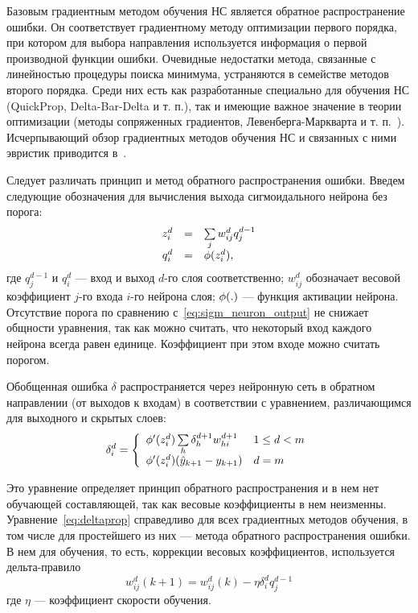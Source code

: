 Базовым градиентным методом обучения НС является обратное
распространение ошибки.  Он соответствует градиентному методу
оптимизации первого порядка, при котором для выбора направления
используется информация о первой производной функции ошибки.
Очевидные недостатки метода, связанные с линейностью процедуры поиска
минимума, устраняются в семействе методов второго порядка.  Среди них
есть как разработанные специально для обучения НС (QuickProp,
Delta-Bar-Delta и т. п.), так и имеющие важное значение в теории
оптимизации (методы сопряженных градиентов, Левенберга-Маркварта и
т. п.~\cite{himmelblau75}).  Исчерпывающий обзор градиентных методов
обучения НС и связанных с ними эвристик приводится в~\cite{gibb96}.

Следует различать принцип и метод обратного распространения ошибки.
Введем следующие обозначения для вычисления выхода сигмоидального
нейрона без порога:
\begin{equation}
\label{eq:sigm_neuron_output_parts}
\begin{array}{rcl}
  z^d_i & = & \sum\limits_j w^d_{ij}q^{d-1}_j \\
  q^d_i & = & \fa(z^d_i),
\end{array}
\end{equation} где $q^{d-1}_j$ и $q^d_i$ --- вход и выход $d$-го слоя
соответственно; $w^d_{ij}$ обозначает весовой коэффициент $j$-го входа
$i$-го нейрона слоя; $\phi(.)$ --- функция активации нейрона.
Отсутствие порога по сравнению с~\eqref{eq:sigm_neuron_output} не
снижает общности уравнения, так как можно считать, что некоторый вход
каждого нейрона всегда равен единице.  Коэффициент при этом входе
можно считать порогом.

Обобщенная ошибка $\delta$ распространяется через нейронную сеть в
обратном направлении (от выходов к входам) в соответствии с
уравнением, различающимся для выходного и скрытых слоев:
\begin{equation}
\label{eq:deltaprop}
  \delta^d_i=\left\{\begin{array}{ll}
    \fa'(z^d_i)\sum\limits_h\delta^{d+1}_h w^{d+1}_{hi} & 1\le d<m \\
    \fa'(z^d_i)(\hat{y}_{k+1}-y_{k+1}) & d=m \\
  \end{array}\right.
\end{equation}

Это уравнение определяет принцип обратного распространения и в нем нет
обучающей составляющей, так как весовые коэффициенты в нем неизменны.
Уравнение~\eqref{eq:deltaprop} справедливо для всех градиентных
методов обучения, в том числе для простейшего из них --- метода
обратного распространения ошибки.  В нем для обучения, то есть,
коррекции весовых коэффициентов, используется дельта-правило
\begin{equation}
\label{eq:weightchange}
  w^d_{ij}(k+1)=w^d_{ij}(k)-\eta\delta^d_i q^{d-1}_j
\end{equation} где $\eta$ --- коэффициент скорости обучения.

